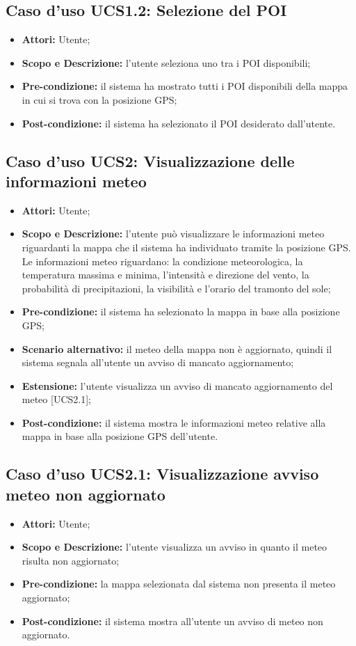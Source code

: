\subsection{Caso d'uso UCS1.2: Selezione del POI}
\begin{itemize}
\item \textbf{Attori:} Utente;
\item \textbf{Scopo e Descrizione:} l'utente seleziona uno tra i POI disponibili;
\item \textbf{Pre-condizione:} il sistema ha mostrato tutti i POI disponibili della mappa in cui si trova con la posizione GPS;
\item \textbf{Post-condizione:} il sistema ha selezionato il POI desiderato dall'utente.
\end{itemize}

\subsection{Caso d'uso UCS2: Visualizzazione delle informazioni meteo}
\begin{itemize}
\item \textbf{Attori:} Utente;
\item \textbf{Scopo e Descrizione:} l'utente può visualizzare le informazioni meteo riguardanti la mappa che il sistema ha individuato tramite la posizione GPS. Le informazioni meteo riguardano: la condizione meteorologica, la temperatura massima e minima, l'intensità e direzione del vento, la probabilità di precipitazioni, la visibilità e l'orario del tramonto del sole;
\item \textbf{Pre-condizione:} il sistema ha selezionato la mappa in base alla posizione GPS;
\item \textbf{Scenario alternativo:} il meteo della mappa non è aggiornato, quindi il sistema segnala all'utente un avviso di mancato aggiornamento;
\item \textbf{Estensione:} l'utente visualizza un avviso di mancato aggiornamento del meteo [UCS2.1];
\item \textbf{Post-condizione:} il sistema mostra le informazioni meteo relative alla mappa in base alla posizione GPS dell'utente.
\end{itemize}

\subsection{Caso d'uso UCS2.1: Visualizzazione avviso meteo non aggiornato}
\begin{itemize}
\item \textbf{Attori:} Utente;
\item \textbf{Scopo e Descrizione:} l'utente visualizza un avviso in quanto il meteo risulta non aggiornato;
\item \textbf{Pre-condizione:} la mappa selezionata dal sistema non presenta il meteo aggiornato; 
\item \textbf{Post-condizione:} il sistema mostra all'utente un avviso di meteo non aggiornato.
\end{itemize}


